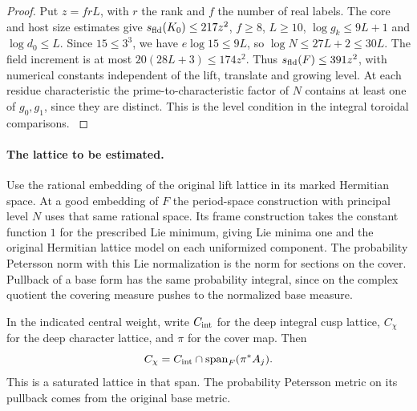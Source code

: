 \begin{proof}
Put \(z=frL\), with \(r\) the rank and \(f\) the number of
real labels. The core and host size estimates give
\(s_{\rm fld}(K_0)\le217z^2\), \(f\ge8\), \(L\ge10\),
\(\log g_k\le9L+1\) and \(\log d_0\le L\).
Since \(15\le3^3\), we have \(e\log 15\le9L\), so
\(\log N\le27L+2\le30L\). The field increment is at most
\(20(28L+3)\le174z^2\). Thus \(s_{\rm fld}(F)\le391z^2\),
with numerical constants independent of the lift, translate
and growing level. At each residue characteristic the
prime-to-characteristic factor of \(N\) contains at least one
of \(g_0,g_1\), since they are distinct. This is the level
condition in the integral toroidal comparisons.
\label{cor:deep-cover-on-core-5}

\end{proof}

\paragraph{The lattice to be estimated.}
Use the rational embedding of the original lift lattice
in its marked Hermitian space. At a good embedding of \(F\)
the period-space construction with principal level \(N\)
uses that same rational space. Its frame construction takes
the constant function \(1\) for the prescribed Lie minimum,
giving Lie minima one and the original Hermitian lattice
model on each uniformized component. The probability
Petersson norm with this Lie normalization is the norm
for sections on the cover. Pullback of a base form has
the same probability integral, since on the complex
quotient the covering measure pushes to the normalized
base measure.
\label{cor:deep-cover-on-core-6}

\begin{proposition}\label{prop:deep-cover-type-lattice}
In the indicated central weight, write \(C_{\rm int}\) for the deep integral cusp lattice, \(C_\chi\) for the deep character lattice, and \(\pi\) for the cover map. Then
\[
 C_\chi=C_{\rm int}\cap\operatorname{span}_F(\pi^*A_j).
\]
 This is a saturated
lattice in that span. The probability Petersson metric on its
pullback comes from the original base metric.
\end{proposition}

